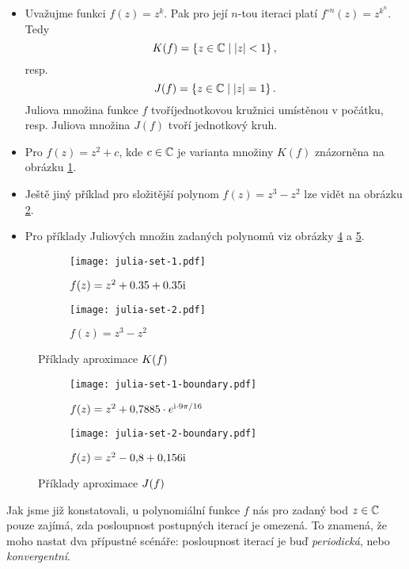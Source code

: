 \begin{example}
    \begin{itemize}
        \item Uvažujme funkci $f(z)=z^k$. Pak pro její $n$-tou iteraci platí $f^{\circ n}(z)=z^{k^n}$. Tedy
        \[K(f)=\left\{z\in\mathbb{C}\mid |z|<1\right\},\]
        resp.
        \[J(f)=\left\{z\in\mathbb{C}\mid|z|=1\right\}.\]
        Juliova množina funkce $f$ tvoříjednotkovou kružnici umístěnou v počátku, resp. Juliova množina $J(f)$ tvoří jednotkový kruh.
        \item Pro $f(z)=z^2+c$, kde $c\in\mathbb{C}$ je varianta množiny $K(f)$ znázorněna na obrázku \ref{subfig:vyplnena-juliova-mnozina-1}.
        \item Ještě jiný příklad pro složitější polynom $f(z)=z^3-z^2$ lze vidět na obrázku \ref{subfig:vyplnena-juliova-mnozina-2}.
        \item Pro příklady Juliových množin zadaných polynomů viz obrázky \ref{subfig:juliova-mnozina-1} a \ref{subfig:juliova-mnozina-2}.
    \end{itemize}
\end{example}
\begin{figure}[h]
    \centering
    \begin{subfigure}{0.45\textwidth}
        \centering
        \texttt{[image: julia-set-1.pdf]}
        \caption{$f(z)=z^2+0.35 + 0.35\textrm{i}$}
        \label{subfig:vyplnena-juliova-mnozina-1}
    \end{subfigure}
    \qquad
    \begin{subfigure}{0.45\textwidth}
        \centering
        \texttt{[image: julia-set-2.pdf]}
        \caption{$f(z)=z^3-z^2$}
        \label{subfig:vyplnena-juliova-mnozina-2}
    \end{subfigure}
    \caption{Příklady aproximace $K(f)$}
    \label{fig:priklady-vyplnenych-juliovych-mnozin}
\end{figure}
\begin{figure}[h]
    \centering
    \begin{subfigure}{0.45\textwidth}
        \centering
        \texttt{[image: julia-set-1-boundary.pdf]}
        \caption{$f(z)=z^2 + 0{,}7885\cdot e^{\textrm{i}\cdot9\pi/16}$}
        \label{subfig:juliova-mnozina-1}
    \end{subfigure}
    \qquad
    \begin{subfigure}{0.45\textwidth}
        \centering
        \texttt{[image: julia-set-2-boundary.pdf]}
        \caption{$f(z)=z^2 - 0{,}8 + 0{,}156\textrm{i}$}
        \label{subfig:juliova-mnozina-2}
    \end{subfigure}
    \caption{Příklady aproximace $J(f)$}
    \label{fig:priklady-juliovych-mnozin}
\end{figure}
Jak jsme již konstatovali, u polynomiální funkce $f$ nás pro zadaný bod $z\in\mathbb{C}$ pouze zajímá, zda posloupnost postupných iterací je omezená. To znamená, že moho nastat dva přípustné scénáře: posloupnost iterací je buď \emph{periodická}, nebo \emph{konvergentní}.

